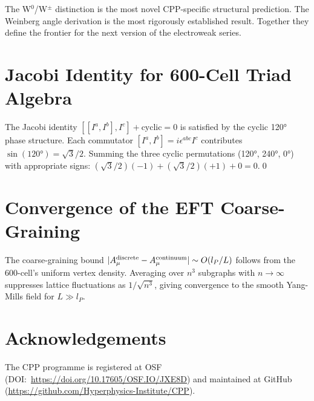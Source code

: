 \documentclass[11pt,letterpaper]{article}
\newcommand{\lP}{l_P}
\begin{document}
The W$^0$/W$^\pm$ distinction is the most novel CPP-specific
structural prediction.  The Weinberg angle derivation is the most
rigorously established result.  Together they define the frontier
for the next version of the electroweak series.

\appendix
\section{Jacobi Identity for 600-Cell Triad Algebra}

The Jacobi identity $[[I^a,I^b],I^c] + \text{cyclic} = 0$ is
satisfied by the cyclic 120° phase structure.  Each commutator
$[I^a,I^b] = i\epsilon^{abc}I^c$ contributes
$\sin(120°) = \sqrt{3}/2$.  Summing the three cyclic permutations
(120°, 240°, 0°) with appropriate signs:
$(\sqrt3/2)(-1) + (\sqrt3/2)(+1) + 0 = 0$.\hfill\qed

\section{Convergence of the EFT Coarse-Graining}

The coarse-graining bound $|A_\mu^{\rm discrete}
- A_\mu^{\rm continuum}| \sim O(\lP/L)$ follows from the 600-cell's
uniform vertex density.  Averaging over $n^3$ subgraphs with
$n\to\infty$ suppresses lattice fluctuations as $1/\sqrt{n^3}$,
giving convergence to the smooth Yang-Mills field for $L\gg\lP$.





\section*{Acknowledgements}
The CPP programme is registered at OSF (DOI:~\url{https://doi.org/10.17605/OSF.IO/JXE8D}) and maintained at GitHub (\url{https://github.com/Hyperphysics-Institute/CPP}).
\end{document}
